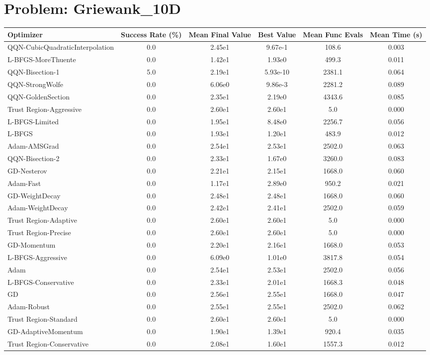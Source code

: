 \documentclass{article}
\begin{document}
\section{Problem: Griewank\_10D}
\begin{longtable}{p{3cm}*{5}{c}}
\toprule
\textbf{Optimizer} & \textbf{Success Rate (\%)} & \textbf{Mean Final Value} & \textbf{Best Value} & \textbf{Mean Func Evals} & \textbf{Mean Time (s)} \\
\midrule
QQN-CubicQuadraticInterpolation & 0.0 & 2.45e1 & 9.67e-1 & 108.6 & 0.003 \\
L-BFGS-MoreThuente & 0.0 & 1.42e1 & 1.93e0 & 499.3 & 0.011 \\
QQN-Bisection-1 & 5.0 & 2.19e1 & 5.93e-10 & 2381.1 & 0.064 \\
QQN-StrongWolfe & 0.0 & 6.06e0 & 9.86e-3 & 2281.2 & 0.089 \\
QQN-GoldenSection & 0.0 & 2.35e1 & 2.19e0 & 4343.6 & 0.085 \\
Trust Region-Aggressive & 0.0 & 2.60e1 & 2.60e1 & 5.0 & 0.000 \\
L-BFGS-Limited & 0.0 & 1.95e1 & 8.48e0 & 2256.7 & 0.056 \\
L-BFGS & 0.0 & 1.93e1 & 1.20e1 & 483.9 & 0.012 \\
Adam-AMSGrad & 0.0 & 2.54e1 & 2.53e1 & 2502.0 & 0.063 \\
QQN-Bisection-2 & 0.0 & 2.33e1 & 1.67e0 & 3260.0 & 0.083 \\
GD-Nesterov & 0.0 & 2.21e1 & 2.15e1 & 1668.0 & 0.060 \\
Adam-Fast & 0.0 & 1.17e1 & 2.89e0 & 950.2 & 0.021 \\
GD-WeightDecay & 0.0 & 2.48e1 & 2.48e1 & 1668.0 & 0.060 \\
Adam-WeightDecay & 0.0 & 2.42e1 & 2.41e1 & 2502.0 & 0.059 \\
Trust Region-Adaptive & 0.0 & 2.60e1 & 2.60e1 & 5.0 & 0.000 \\
Trust Region-Precise & 0.0 & 2.60e1 & 2.60e1 & 5.0 & 0.000 \\
GD-Momentum & 0.0 & 2.20e1 & 2.16e1 & 1668.0 & 0.053 \\
L-BFGS-Aggressive & 0.0 & 6.09e0 & 1.01e0 & 3817.8 & 0.054 \\
Adam & 0.0 & 2.54e1 & 2.53e1 & 2502.0 & 0.056 \\
L-BFGS-Conservative & 0.0 & 2.33e1 & 2.01e1 & 1668.3 & 0.048 \\
GD & 0.0 & 2.56e1 & 2.55e1 & 1668.0 & 0.047 \\
Adam-Robust & 0.0 & 2.55e1 & 2.55e1 & 2502.0 & 0.062 \\
Trust Region-Standard & 0.0 & 2.60e1 & 2.60e1 & 5.0 & 0.000 \\
GD-AdaptiveMomentum & 0.0 & 1.90e1 & 1.39e1 & 920.4 & 0.035 \\
Trust Region-Conservative & 0.0 & 2.08e1 & 1.60e1 & 1557.3 & 0.012 \\
\bottomrule
\end{longtable}
\end{document}
